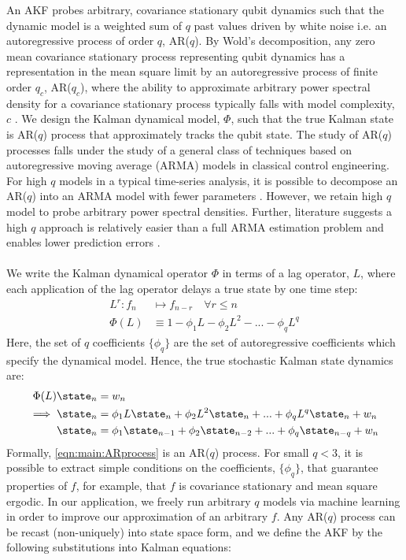 An AKF probes arbitrary, covariance stationary qubit dynamics such that the dynamic model is a weighted sum of $q$ past values driven by white noise i.e. an autoregressive process of order $q$, AR($q$). By Wold's decomposition, any zero mean covariance stationary process representing qubit dynamics has a representation in the mean square limit by an autoregressive process of finite order $q_c$, AR($q_c$), where the ability to approximate arbitrary power spectral density for a covariance stationary process typically falls with model complexity, $c$ \cite{west1996bayesian}. We design the Kalman dynamical model, $\Phi$, such that the true Kalman state is AR($q$) process that approximately tracks the qubit state. The study of AR($q$) processes falls under the study of a general class of techniques based on autoregressive moving average (ARMA) models in classical control engineering. For high $q$ models in a typical time-series  analysis, it is possible to decompose an AR($q$) into an ARMA model with fewer parameters \cite{brockwell1996introduction, salzmann1991detection}. However, we retain high $q$ model to probe arbitrary power spectral densities. Further, literature suggests a high $q$ approach is relatively easier than a full ARMA estimation problem and enables lower prediction errors \cite{wahlberg1989estimation,brockwell1996introduction}.
\\
\\
We write the Kalman dynamical operator $\Phi$ in terms of a lag operator, $L$, where each application of the lag operator delays a true state by one time step:
\begin{align}
L^r: f_n &\mapsto f_{n-r} \quad \forall r \leq n \\
\Phi(L) & \equiv  1 - \phi_1 L - \phi_2 L^2 - ... - \phi_q L^q 
\end{align}
Here, the set of $q$ coefficients $\{ \phi_q \}$ are the set of autoregressive coefficients which specify the dynamical model. Hence, the true stochastic Kalman state dynamics are:
\begin{align}
\Phi(L) \state_n & = w_n \\ 
\implies \state_n & = \phi_1 L \state_n + \phi_2 L^2 \state_n + ... + \phi_q L^q \state_n + w_n \\
 \state_n &= \phi_1 \state_{n-1} + \phi_2 \state_{n-2} + ... + \phi_q \state_{n-q} + w_n \label{eqn:main:ARprocess}
\end{align}
Formally, \cref{eqn:main:ARprocess} is an AR($q$) process. For small $q < 3$, it is possible to extract simple conditions on the coefficients, $\{ \phi_q \}$, that guarantee properties of $f$, for example, that $f$ is covariance stationary and mean square ergodic. In our application, we freely run arbitrary $q$ models via machine learning in order to improve our approximation of an arbitrary $f$. Any AR($q$) process can be recast (non-uniquely) into state space form, and we define the AKF by the following substitutions into Kalman equations:
